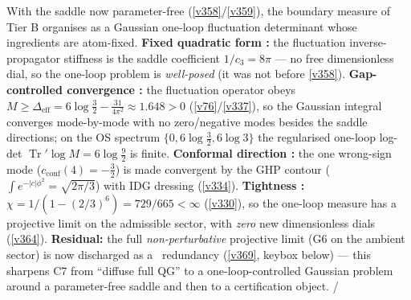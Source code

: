 \documentclass[11pt,a4paper]{article}
\newcommand{\cthree}{c_3}
\begin{document}
\begin{keybox}
With the saddle now parameter-free (\vref{v358}/\vref{v359}), the boundary measure of Tier B organises as a
Gaussian one-loop fluctuation determinant whose ingredients are atom-fixed. \textbf{Fixed quadratic form \mE:}
the fluctuation inverse-propagator stiffness is the saddle coefficient $1/\cthree=8\pi$ --- no free dimensionless
dial, so the one-loop problem is \emph{well-posed} (it was not before \vref{v358}). \textbf{Gap-controlled
convergence \mE:} the fluctuation operator obeys
$M\ge\Delta_{\mathrm{eff}}=6\log\tfrac32-\tfrac{31}{4\pi^2}\approx1.648>0$ (\vref{v76}/\vref{v337}), so the Gaussian
integral converges mode-by-mode with no zero/negative modes besides the saddle directions; on the OS spectrum
$\{0,6\log\tfrac32,6\log3\}$ the regularised one-loop log-det $\operatorname{Tr}'\log M=6\log\tfrac92$ is finite.
\textbf{Conformal direction \mC:} the one wrong-sign mode ($c_{\mathrm{conf}}(4)=-\tfrac32$) is made convergent by
the GHP contour ($\int e^{-|c|\phi^2}=\sqrt{2\pi/3}$) with IDG dressing (\vref{v334}). \textbf{Tightness \mE:}
$\chi=1/(1-(2/3)^6)=729/665<\infty$ (\vref{v330}), so the one-loop measure has a projective limit on the
admissible sector, with \emph{zero} new dimensionless dials (\vref{v364}). \textbf{Residual:} the full
\emph{non-perturbative} projective limit (G6 on the ambient sector) is now discharged as a \mC\ redundancy
(\vref{v369}, keybox below) --- this sharpens C7 from
``diffuse full QG'' to a one-loop-controlled Gaussian problem around a parameter-free saddle and then to a
certification object. \mE/\mC
\end{keybox}
\end{document}
